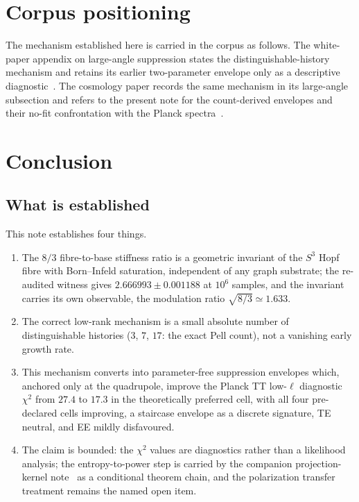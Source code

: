 \documentclass[11pt]{article}
\begin{document}
\section{Corpus positioning}
\label{sec:positioning}

The mechanism established here is carried in the corpus as follows.
The white-paper appendix on large-angle suppression states the distinguishable-history mechanism
and retains its earlier two-parameter envelope only as a descriptive
diagnostic~\cite{Cosmochrony}.
The cosmology paper records the same mechanism in its large-angle subsection and refers to the
present note for the count-derived envelopes and their no-fit confrontation with the Planck
spectra~\cite{Beau2026d}.

\section{Conclusion}
\label{sec:conclusion}

\subsection{What is established}
\label{subsec:established}

This note establishes four things.

\begin{enumerate}
\item The $8/3$ fibre-to-base stiffness ratio is a geometric invariant of the $S^3$ Hopf fibre
with Born--Infeld saturation, independent of any graph substrate; the re-audited witness gives
$2.666993\pm0.001188$ at $10^6$ samples, and the invariant carries its own observable, the
modulation ratio $\sqrt{8/3}\simeq1.633$.
\item The correct low-rank mechanism is a small absolute number of distinguishable histories
($3$, $7$, $17$: the exact Pell count), not a vanishing early growth rate.
\item This mechanism converts into parameter-free suppression envelopes which, anchored only at
the quadrupole, improve the Planck TT low-$\ell$ diagnostic $\chi^2$ from $27.4$ to $17.3$ in the
theoretically preferred cell, with all four pre-declared cells improving, a staircase envelope as
a discrete signature, TE neutral, and EE mildly disfavoured.
\item The claim is bounded: the $\chi^2$ values are diagnostics rather than a likelihood
analysis; the entropy-to-power step is carried by the companion projection-kernel
note~\cite{Beau2026pce} as a conditional theorem chain, and the polarization transfer treatment
remains the named open item.
\end{enumerate}
\end{document}
